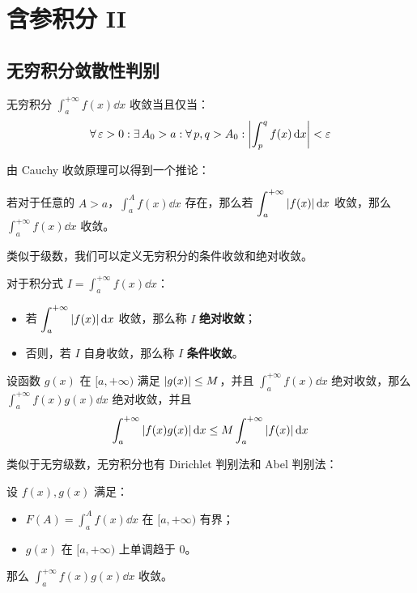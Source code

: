 \section{含参积分 II}

\subsection{无穷积分敛散性判别}

\begin{theorem}
	无穷积分 $\displaystyle \int_{a}^{+\infty} f(x) \dd{x}$ 收敛当且仅当：
	$$
	\forall\,\varepsilon > 0: \exists\,A_0 > a: \forall\,p, q > A_0: \abs{\int_{p}^{q} f(x) \dd{x}} < \varepsilon
	$$
\end{theorem}

由 Cauchy 收敛原理可以得到一个推论：

\begin{corollary}
	若对于任意的 $A > a$，$\displaystyle \int_{a}^{A} f(x) \dd{x}$ 存在，那么若 $\displaystyle \int_{a}^{+ \infty} \abs{f(x)} \dd{x}$ 收敛，那么 $\displaystyle \int_{a}^{+ \infty} f(x) \dd{x}$ 收敛。
\end{corollary}

类似于级数，我们可以定义无穷积分的条件收敛和绝对收敛。

\begin{definition}[条件收敛和绝对收敛]
	对于积分式 $\displaystyle I = \int_{a}^{+ \infty} f(x) \dd{x}$：
	\begin{itemize}
		\item 若 $\displaystyle \int_{a}^{+ \infty} \abs{f(x)} \dd{x}$ 收敛，那么称 $I$ \textbf{绝对收敛}；
		\item 否则，若 $I$ 自身收敛，那么称 $I$ \textbf{条件收敛}。
	\end{itemize}
\end{definition}

\begin{definition}
	设函数 $g(x)$ 在 $[a, +\infty)$ 满足 $\abs{g(x)} \le M$，并且 $\displaystyle\int_{a}^{+\infty} f(x) \dd{x}$ 绝对收敛，那么 $\displaystyle \int_{a}^{+\infty} f(x) g(x) \dd{x}$ 绝对收敛，并且
	$$
	\int_{a}^{+ \infty} \abs{f(x) g(x)} \dd{x} \le M \int_{a}^{+\infty} \abs{f(x)} \dd{x}
	$$
\end{definition}

类似于无穷级数，无穷积分也有 Dirichlet 判别法和 Abel 判别法：

\begin{theorem}
	设 $f(x), g(x)$ 满足：
	\begin{itemize}
		\item $\displaystyle F(A) = \int_{a}^{A} f(x) \dd{x}$ 在 $[a, + \infty)$ 有界；
		\item $g(x)$ 在 $[a, + \infty)$ 上单调趋于 $0$。
	\end{itemize}
	那么 $\displaystyle \int_{a}^{+\infty} f(x) g(x) \dd{x}$ 收敛。
\end{theorem}

